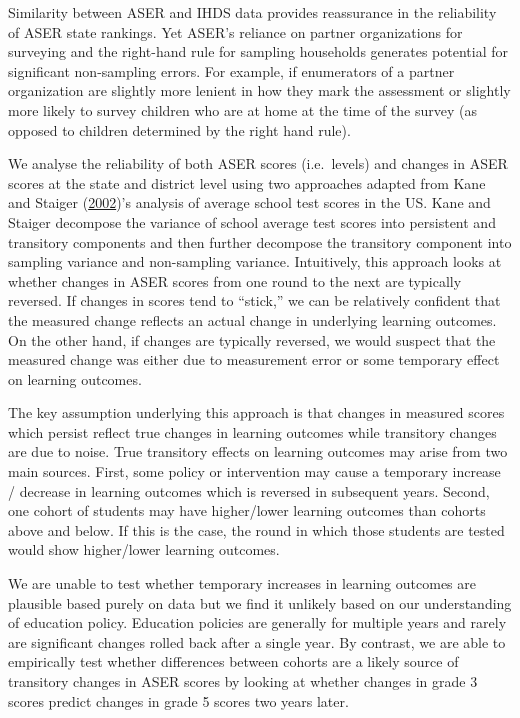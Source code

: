 \documentclass[
  11pt,
]{article}
\begin{document}
Similarity between ASER and IHDS data provides reassurance in the reliability of ASER state rankings. Yet ASER's reliance on partner organizations for surveying and the right-hand rule for sampling households generates potential for significant non-sampling errors. For example, if enumerators of a partner organization are slightly more lenient in how they mark the assessment or slightly more likely to survey children who are at home at the time of the survey (as opposed to children determined by the right hand rule).

We analyse the reliability of both ASER scores (i.e.~levels) and changes in ASER scores at the state and district level using two approaches adapted from Kane and Staiger (\protect\hyperlink{ref-kane2002promise}{2002})'s analysis of average school test scores in the US. Kane and Staiger decompose the variance of school average test scores into persistent and transitory components and then further decompose the transitory component into sampling variance and non-sampling variance. Intuitively, this approach looks at whether changes in ASER scores from one round to the next are typically reversed. If changes in scores tend to ``stick,'' we can be relatively confident that the measured change reflects an actual change in underlying learning outcomes. On the other hand, if changes are typically reversed, we would suspect that the measured change was either due to measurement error or some temporary effect on learning outcomes.

The key assumption underlying this approach is that changes in measured scores which persist reflect true changes in learning outcomes while transitory changes are due to noise. True transitory effects on learning outcomes may arise from two main sources. First, some policy or intervention may cause a temporary increase / decrease in learning outcomes which is reversed in subsequent years. Second, one cohort of students may have higher/lower learning outcomes than cohorts above and below. If this is the case, the round in which those students are tested would show higher/lower learning outcomes.

We are unable to test whether temporary increases in learning outcomes are plausible based purely on data but we find it unlikely based on our understanding of education policy. Education policies are generally for multiple years and rarely are significant changes rolled back after a single year. By contrast, we are able to empirically test whether differences between cohorts are a likely source of transitory changes in ASER scores by looking at whether changes in grade 3 scores predict changes in grade 5 scores two years later.
\end{document}
